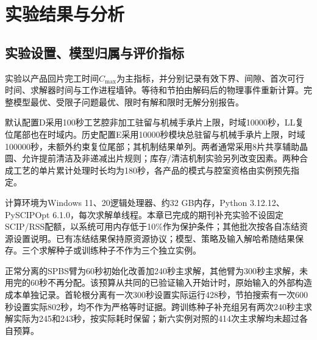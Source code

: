 \chapter{实验结果与分析}\label{sec:experiments-cn}
\section{实验设置、模型归属与评价指标}\label{sec:experiment-settings-cn}
实验以产品回片完工时间$C_{\max}$为主指标，并分别记录有效下界、间隙、首次可行时间、求解器时间与工作进程墙钟。等待和节拍由解码后的物理事件重新计算。完整模型最优、受限子问题最优、限时有解和限时无解分别报告。

默认配置D采用100秒工艺腔非加工驻留与机械手承片上限，时域10000秒，LL复位尾部也在时域内。历史配置E采用10000秒模块总驻留与机械手承片上限，时域100000秒，未额外约束复位尾部；其机制结果单列。两者通常采用8片共享辅助晶圆、允许提前清洁及非递减出片规则；库存/清洁机制实验另列改变因素。两种合成工艺的单片累计处理时长均为180秒，各产品的模式与腔室资格由实例预先指定。

计算环境为Windows 11、20逻辑处理器、约32 GB内存，Python 3.12.12、PySCIPOpt 6.1.0，每次求解单线程。本章已完成的期刊补充实验不设固定SCIP/RSS配额，以系统可用内存低于10\%作为保护条件；其他批次按各自冻结资源设置说明。已有冻结结果保持原资源协议；模型、策略及输入解哈希随结果保存。三个求解种子或训练种子不作为三个独立实例。

正常分离的SPBS臂为60秒初始化改善加240秒主求解，其他臂为300秒主求解，未用完的60秒不再分配。该预算从共同的已验证输入开始计时，原始输入的外部构造成本单独记录。首轮根分离有一次300秒设置实际运行428秒，节拍搜索有一次600秒设置实际802秒，均不作为严格等时证据。跨训练种子补充组另有两次240秒主求解实际为245和243秒，按实际耗时保留；新六实例对照的414次主求解均未超过各自预算。
